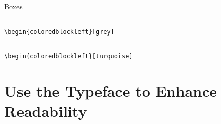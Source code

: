 \documentclass[aspectratio=169]{beamer}
\begin{document}
\begin{frame}{Boxes}
\begin{columns}
\begin{column}{0.49\textwidth}
            \begin{coloredblockleft}
                \vspace{0.3cm}
                \footnotesize\texttt{\textbackslash begin\{coloredblockleft\}[grey]}\strut
            \end{coloredblockleft}
        
        \end{column}
    \end{columns}

    \centering
    \begin{minipage}[t]{0.49\textwidth}
        \begin{coloredblockleft}
            \vspace{0.3cm}
            \footnotesize\texttt{\textbackslash begin\{coloredblockleft\}[turquoise]}\strut
        \end{coloredblockleft}
        
    \end{minipage}
\end{frame}


\section{Use the \textbf{Typeface} to Enhance Readability}

\begin{frame}
\end{frame}
\end{document}
